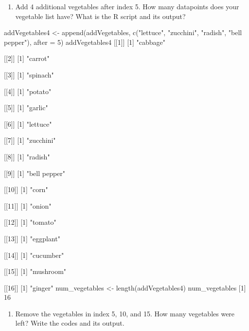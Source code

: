 \documentclass[
]{article}
\newenvironment{Shaded}{\begin{snugshade}}{\end{snugshade}}
\newcommand{\NormalTok}[1]{#1}
\providecommand{\tightlist}{%
  \setlength{\itemsep}{0pt}\setlength{\parskip}{0pt}}
\begin{document}
\begin{enumerate}
\def\labelenumi{\alph{enumi}.}
\setcounter{enumi}{2}
\tightlist
\item
  Add 4 additional vegetables after index 5. How many datapoints does
  your vegetable list have? What is the R script and its output?
\end{enumerate}

\begin{Shaded}
\begin{Highlighting}[]
\NormalTok{addVegetables4 \textless{}{-} append(addVegetables, c("lettuce", "zucchini", "radish", "bell pepper"), after = 5)}
\NormalTok{addVegetables4}
\NormalTok{[[1]]}
\NormalTok{[1] "cabbage"}

\NormalTok{[[2]]}
\NormalTok{[1] "carrot"}

\NormalTok{[[3]]}
\NormalTok{[1] "spinach"}

\NormalTok{[[4]]}
\NormalTok{[1] "potato"}

\NormalTok{[[5]]}
\NormalTok{[1] "garlic"}

\NormalTok{[[6]]}
\NormalTok{[1] "lettuce"}

\NormalTok{[[7]]}
\NormalTok{[1] "zucchini"}

\NormalTok{[[8]]}
\NormalTok{[1] "radish"}

\NormalTok{[[9]]}
\NormalTok{[1] "bell pepper"}

\NormalTok{[[10]]}
\NormalTok{[1] "corn"}

\NormalTok{[[11]]}
\NormalTok{[1] "onion"}

\NormalTok{[[12]]}
\NormalTok{[1] "tomato"}

\NormalTok{[[13]]}
\NormalTok{[1] "eggplant"}

\NormalTok{[[14]]}
\NormalTok{[1] "cucumber"}

\NormalTok{[[15]]}
\NormalTok{[1] "mushroom"}

\NormalTok{[[16]]}
\NormalTok{[1] "ginger"}
\NormalTok{num\_vegetables \textless{}{-} length(addVegetables4)}
\NormalTok{num\_vegetables }
\NormalTok{[1] 16}
\end{Highlighting}
\end{Shaded}

\begin{enumerate}
\def\labelenumi{\alph{enumi}.}
\setcounter{enumi}{3}
\tightlist
\item
  Remove the vegetables in index 5, 10, and 15. How many vegetables were
  left? Write the codes and its output.
\end{enumerate}
\end{document}
